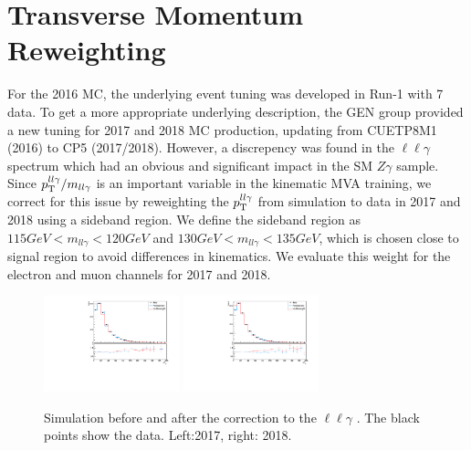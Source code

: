 \section{Transverse Momentum Reweighting}\label{sec:Zpt}
For the 2016 MC, the underlying event tuning was developed in Run-1 with 7 \TeV data. 
To get a more appropriate underlying description, the GEN group provided a new tuning
for 2017 and 2018 MC production, updating from CUETP8M1 (2016) to CP5 (2017/2018).
However, a discrepency was found in the $\ell\ell\gamma$ \pt spectrum
which had an obvious and significant impact in the SM $Z\gamma$ sample. 
Since $p_{\mathrm{T}}^{ll\gamma}/m_{ll\gamma}$ is an important variable in the kinematic MVA training, 
we correct for this issue by reweighting the $p_{\mathrm{T}}^{ll\gamma}$ from simulation to data in 
2017 and 2018 using a sideband region. 
We define the sideband region as $115GeV<m_{ll\gamma}<120GeV$ and $130GeV<m_{ll\gamma}<135GeV$,
which is chosen close to signal region to avoid differences in kinematics.
We evaluate this weight for the electron and muon channels for 2017 and 2018.
\begin{figure}[htbp]
	\begin{center}
		\includegraphics[width=0.35\textwidth]{fig/zpt_reweight/zgptrewei_datasb17.pdf}
		\includegraphics[width=0.35\textwidth]{fig/zpt_reweight/zgptrewei_datasb18.pdf}
	\end{center}
	\caption{Simulation before and after the correction to the $\ell\ell\gamma$ \pt.
    The black points show the data. Left:2017, right: 2018.}
\end{figure}

